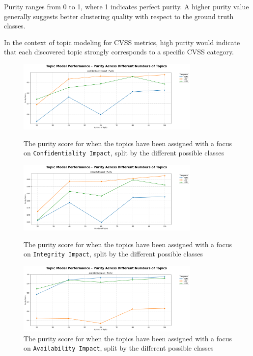 \documentclass[12pt]{article}
\begin{document}
Purity ranges from 0 to 1, where 1 indicates perfect purity. A higher purity value generally
suggests better clustering quality with respect to the ground truth classes\cite{purity_info_ret}.

In the context of topic modeling for CVSS metrics, high purity would indicate that each discovered
topic strongly corresponds to a specific CVSS category.

\begin{figure}[h!]
	\centering

	\begin{minipage}[t]{\textwidth}
		\centering
		\includegraphics[width=0.8\textwidth]{figures/purity/topic_model_performance_purity_ground_truth_confidentialityImpact.pdf}
		\caption{The purity score for when the topics have been assigned with a focus on \texttt{Confidentiality Impact}, split by the different possible classes}
		\label{fig:purity_20_confidentiality}
	\end{minipage}

	\begin{minipage}[t]{\textwidth}
		\centering
		\includegraphics[width=0.8\textwidth]{figures/purity/topic_model_performance_purity_ground_truth_integrityImpact.pdf}
		\caption{The purity score for when the topics have been assigned with a focus on \texttt{Integrity Impact}, split by the different possible classes}
		\label{fig:purity_integrity}
	\end{minipage}


	\begin{minipage}[t]{\textwidth}
		\centering
		\includegraphics[width=0.8\textwidth]{figures/purity/topic_model_performance_purity_ground_truth_availabilityImpact.pdf}
		\caption{The purity score for when the topics have been assigned with a focus on \texttt{Availability Impact}, split by the different possible classes}
		\label{fig:purity_20_availability}
	\end{minipage}



\end{figure}
\end{document}

